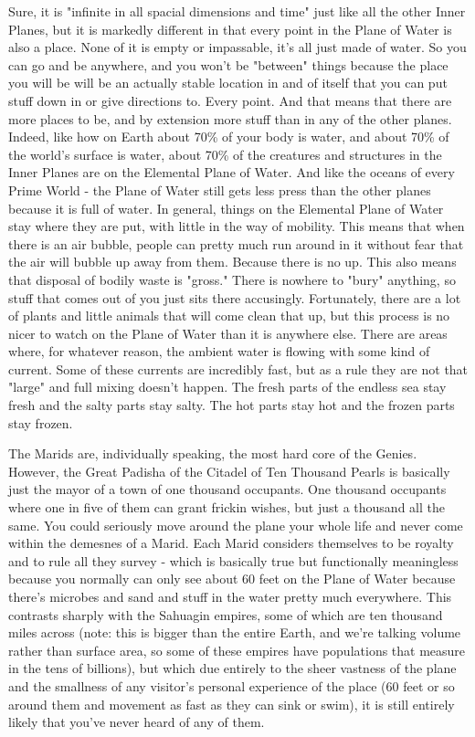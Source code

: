 Sure, it is "infinite in all spacial dimensions and time" just like all the other Inner Planes, but it is markedly different in that every point in the Plane of Water is also a place. None of it is empty or impassable, it's all just made of water. So you can go and be anywhere, and you won't be "between" things because the place you will be will be an actually stable location in and of itself that you can put stuff down in or give directions to. Every point. And that means that there are more places to be, and by extension more stuff than in any of the other planes. Indeed, like how on Earth about 70\% of your body is water, and about 70\% of the world's surface is water, about 70\% of the creatures and structures in the Inner Planes are on the Elemental Plane of Water. And like the oceans of every Prime World - the Plane of Water still gets less press than the other planes because it is full of water. In general, things on the Elemental Plane of Water stay where they are put, with little in the way of mobility. This means that when there is an air bubble, people can pretty much run around in it without fear that the air will bubble up away from them. Because there is no up. This also means that disposal of bodily waste is "gross." There is nowhere to "bury" anything, so stuff that comes out of you just sits there accusingly. Fortunately, there are a lot of plants and little animals that will come clean that up, but this process is no nicer to watch on the Plane of Water than it is anywhere else. There are areas where, for whatever reason, the ambient water is flowing with some kind of current. Some of these currents are incredibly fast, but as a rule they are not that "large" and full mixing doesn't happen. The fresh parts of the endless sea stay fresh and the salty parts stay salty. The hot parts stay hot and the frozen parts stay frozen.

The Marids are, individually speaking, the most hard core of the Genies. However, the Great Padisha of the Citadel of Ten Thousand Pearls is basically just the mayor of a town of one thousand occupants. One thousand occupants where one in five of them can grant frickin wishes, but just a thousand all the same. You could seriously move around the plane your whole life and never come within the demesnes of a Marid. Each Marid considers themselves to be royalty and to rule all they survey - which is basically true but functionally meaningless because you normally can only see about 60 feet on the Plane of Water because there's microbes and sand and stuff in the water pretty much everywhere. This contrasts sharply with the Sahuagin empires, some of which are ten thousand miles across (note: this is bigger than the entire Earth, and we're talking volume rather than surface area, so some of these empires have populations that measure in the tens of billions), but which due entirely to the sheer vastness of the plane and the smallness of any visitor's personal experience of the place (60 feet or so around them and movement as fast as they can sink or swim), it is still entirely likely that you've never heard of any of them.


